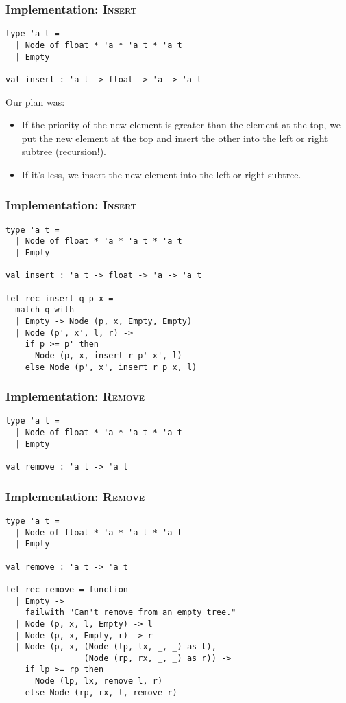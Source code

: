 \documentclass{beamer}
\begin{document}
\begin{frame}[fragile]
\frametitle{Implementation: \textsc{Insert}}
\begin{lstlisting}
type 'a t =
  | Node of float * 'a * 'a t * 'a t
  | Empty

val insert : 'a t -> float -> 'a -> 'a t
\end{lstlisting}

Our plan was:
\begin{itemize}
\item If the priority of the new element is greater than the element at the top, we put the new element at the top and insert the other into the left or right subtree (recursion!).
\item If it's less, we insert the new element into the left or right subtree.
\end{itemize}
\end{frame}

\begin{frame}[fragile]
\frametitle{Implementation: \textsc{Insert}}
\begin{lstlisting}
type 'a t =
  | Node of float * 'a * 'a t * 'a t
  | Empty

val insert : 'a t -> float -> 'a -> 'a t

let rec insert q p x =
  match q with
  | Empty -> Node (p, x, Empty, Empty)
  | Node (p', x', l, r) ->
    if p >= p' then
      Node (p, x, insert r p' x', l)
    else Node (p', x', insert r p x, l)
\end{lstlisting}
\end{frame}

\begin{frame}[fragile]
\frametitle{Implementation: \textsc{Remove}}
\begin{lstlisting}
type 'a t =
  | Node of float * 'a * 'a t * 'a t
  | Empty

val remove : 'a t -> 'a t
\end{lstlisting}
\end{frame}

\begin{frame}[fragile]
\frametitle{Implementation: \textsc{Remove}}
\begin{lstlisting}
type 'a t =
  | Node of float * 'a * 'a t * 'a t
  | Empty

val remove : 'a t -> 'a t

let rec remove = function
  | Empty ->
    failwith "Can't remove from an empty tree."
  | Node (p, x, l, Empty) -> l
  | Node (p, x, Empty, r) -> r
  | Node (p, x, (Node (lp, lx, _, _) as l),
                (Node (rp, rx, _, _) as r)) ->
    if lp >= rp then
      Node (lp, lx, remove l, r)
    else Node (rp, rx, l, remove r)
\end{lstlisting}
\end{frame}
\end{document}
